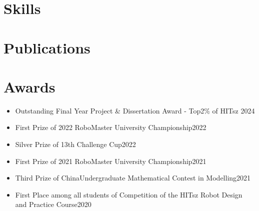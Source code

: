 \documentclass[11pt,a4paper]{moderncv}        %
\begin{document}
\section{Skills}


\section{Publications}
\label{sec:Publications}


\section{Awards}
\begin{itemize}%
    \item Outstanding Final Year Project \& Dissertation Award - Top2\% of HITsz \hfill 2024
    \item First Prize of 2022 RoboMaster University Championship\hfill 2022
    \item Silver Prize of 13th  Challenge Cup\hfill 2022
    \item First Prize of 2021 RoboMaster University Championship\hfill 2021
    \item Third Prize of ChinaUndergraduate Mathematical Contest in Modelling\hfill 2021
    \item First Place among all students of Competition of the HITsz Robot Design and Practice Course\hfill 2020
\end{itemize}

\end{document}
